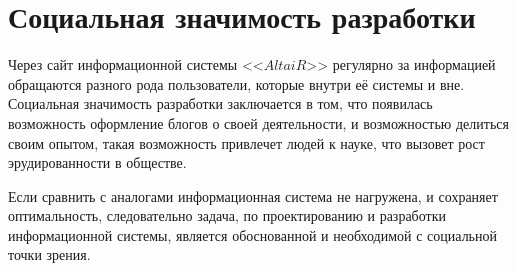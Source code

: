\section{Социальная значимость разработки}
Через сайт информационной системы <<$AltaiR$>> регулярно за информацией обращаются разного рода пользователи, которые внутри её системы и вне. Социальная значимость разработки заключается в том, что появилась возможность оформление блогов о своей деятельности, и возможностью делиться своим опытом, такая возможность привлечет людей к науке, что вызовет рост эрудированности в обществе. 

Если сравнить с аналогами информационная система не нагружена, и сохраняет оптимальность, следовательно задача, по проектированию и разработки информационной системы, является обоснованной и необходимой с социальной точки зрения.  

\pagebreak